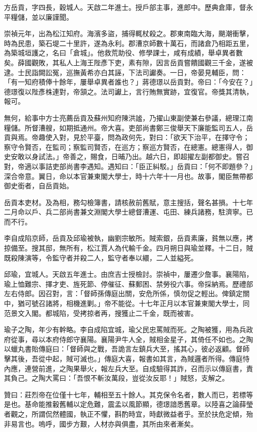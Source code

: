 \begin{pinyinscope}
方岳貢，字四長，穀城人。天啟二年進士。授戶部主事，進郎中。歷典倉庫，督永平糧儲，並以廉謹聞。

崇禎元年，出為松江知府。海濱多盜，捕得輒杖殺之。郡東南臨大海，颶潮衝擊，時為民患，築石堤二十里許，遂為永利。郡漕京師數十萬石，而諸倉乃相距五里，為築城垣護之，名曰「倉城」。他救荒助役、修學課士，咸有成績，舉卓異者數矣。薛國觀敗，其私人上海王陛彥下吏，素有隙，因言岳貢嘗饋國觀三千金，遂被逮。士民詣闕訟冤，巡撫黃希亦白其誣，下法司讞奏。一日，帝晏見輔臣，問：「有一知府積俸十餘年，屢舉卓異者誰也？」蔣德璟以岳貢對。帝曰：「今安在？」德璟復以陛彥株連對，帝頷之。法司讞上，言行賄無實跡，宜復官。帝獎其清執，報可。

無何，給事中方士亮薦岳貢及蘇州知府陳洪謐，乃擢山東副使兼右參議，總理江南糧儲。所督漕艘，如期抵通州。帝大喜。吏部尚書鄭三俊舉天下廉能監司五人，岳貢與焉。帝趣使入對，見於平臺，問為政何先，對曰：「欲天下治平，在擇守令；察守令賢否，在監司；察監司賢否，在巡方；察巡方賢否，在總憲。總憲得人，御史安敢以身試法。」帝善之，賜食，日晡乃出。越六日，即超擢左副都御史。嘗召對，帝適以事詰吏部尚書李遇知。遇知曰：「臣正糾駁。」岳貢曰：「何不即題參？」深合帝意。翼日，命以本官兼東閣大學士，時十六年十一月也。故事，閣臣無帶都御史銜者，自岳貢始。

岳貢本吏材。及為相，務勾檢簿書，請核赦前舊賦，意主搜括，聲名甚損。十七年二月命以戶、兵二部尚書兼文淵閣大學士總督漕運、屯田、練兵諸務，駐濟寧。已而不行。

李自成陷京師，岳貢及邱瑜被執，幽劉宗敏所。賊索銀，岳貢素廉，貧無以應，拷掠備至。搜其邸，無所有，松江賈人為代輸千金。四月朔日與瑜並釋。十二日，賊既殺陳演等，令監守者并殺二人，監守者奉以繯，二人並縊死。

邱瑜，宜城人。天啟五年進士。由庶吉士授檢討。崇禎中，屢遷少詹事。襄陽陷，瑜上恤難宗、擇才吏、旌死節、停催征、蘇郵困、禁勞役六事。帝採納焉。歷禮部左右侍郎。因召對，言：「督師孫傳庭出關，安危所係，慎勿促之輕出。俾鎮定關中，猶可號召諸將，相機進剿。」帝不能從。十七年正月以本官兼東閣大學士，同范景文入閣。都城陷，受拷掠者再，搜獲止二千金，既而被害。

瑜子之陶，年少有幹略。李自成陷宜城，瑜父民忠罵賊而死。之陶被獲，用為兵政府從事，尋以本府侍郎守襄陽。襄陽尹牛人全，賊相金星子，其倚任不如也。之陶以蠟丸書貽傳庭曰：「督師與之戰，吾詭言左鎮兵大至，搖其心，彼必返顧。督師擊其後，吾從中起，賊可滅也。」傳庭大喜，報書如其言，為賊邏者所得。傳庭恃內應，連營前進，之陶果舉火，報左兵大至。自成驗得其詐，召而示以傳庭書，責其負己。之陶大罵曰：「吾恨不斬汝萬段，豈從汝反耶！」賊怒，支解之。

贊曰：莊烈帝在位僅十七年，輔相至五十餘人。其克保令名者，數人而已，若標等是也。基命能推轂舊輔以定危難，震孟以風節顯，德璟諳悉舊章。以陸喜之論薛瑩者觀之，所謂侃然體國，執正不懼，斟酌時宜，時獻微益者乎。至於扶危定傾，殆非易言也。嗚呼，國步方艱，人材亦與俱盡，其所由來者漸矣。


\end{pinyinscope}